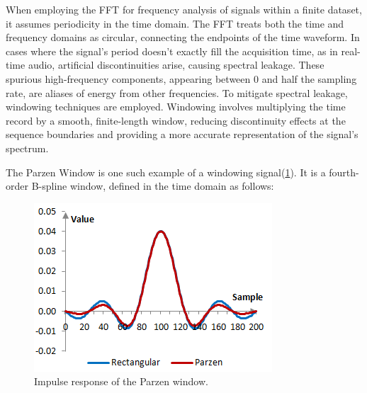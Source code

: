 
When employing the FFT for frequency analysis of signals within a finite dataset, it assumes periodicity in the time domain. The FFT treats both the time and frequency domains as circular, connecting the endpoints of the time waveform. In cases where the signal's period doesn't exactly fill the acquisition time, as in real-time audio, artificial discontinuities arise, causing spectral leakage. These spurious high-frequency components, appearing between 0 and half the sampling rate, are aliases of energy from other frequencies. To mitigate spectral leakage, windowing techniques are employed. Windowing involves multiplying the time record by a smooth, finite-length window, reducing discontinuity effects at the sequence boundaries and providing a more accurate representation of the signal's spectrum.

The Parzen Window is one such example of a windowing signal(\ref{fig:parzenwindow}). It is a fourth-order B-spline window, defined in the time domain as follows: 

\begin{figure}[htbp]
\centering
\includegraphics[width=.3\textwidth]{Sections/IMPLEMENTATION/images/parzenwindow-impulseresponse.png}
\caption{Impulse response of the Parzen window.}
\label{fig:parzenwindow}
\end{figure}


